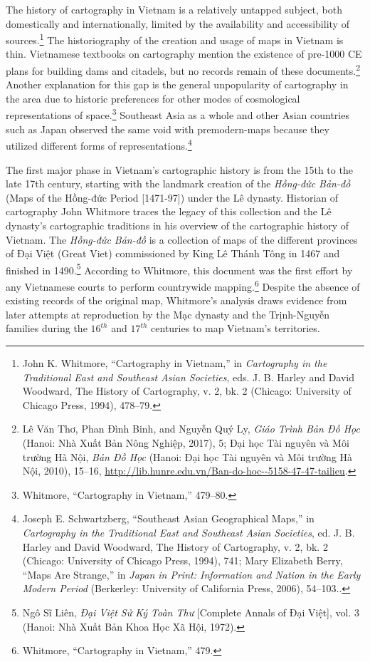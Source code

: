 The history of cartography in Vietnam is a relatively untapped subject, both domestically and internationally, limited by the availability and accessibility of sources.\footnote{John K. Whitmore, “Cartography in Vietnam,” in \textit{Cartography in the Traditional East and Southeast Asian Societies}, eds. J. B. Harley and David Woodward, The History of Cartography, v. 2, bk. 2 (Chicago: University of Chicago Press, 1994), 478–79.} The historiography of the creation and usage of maps in Vietnam is thin. Vietnamese textbooks on cartography mention the existence of pre-1000 CE plans for building dams and citadels, but no records remain of these documents.\footnote{\vi Lê Văn Thơ, Phan Đình Binh, and Nguyễn Quý Ly, \textit{Giáo Trình Bản Đồ Học} (Hanoi: Nhà Xuất Bản Nông Nghiệp, 2017), 5; Đại học Tài nguyên và Môi trường Hà Nội, \textit{Bản Đồ Học} (Hanoi: Đại học Tài nguyên và Môi trường Hà Nội, 2010), 15–16, \url{http://lib.hunre.edu.vn/Ban-do-hoc--5158-47-47-tailieu}.}  Another explanation for this gap is the general unpopularity of cartography in the area due to historic preferences for other modes of cosmological representations of space.\footnote{Whitmore, “Cartography in Vietnam,” 479–80.} Southeast Asia as a whole and other Asian countries such as Japan observed the same void with premodern-maps because they utilized different forms of representations.\footnote{Joseph E. Schwartzberg, “Southeast Asian Geographical Maps,” in \textit{Cartography in the Traditional East and Southeast Asian Societies}, ed. J. B. Harley and David Woodward, The History of Cartography, v. 2, bk. 2 (Chicago: University of Chicago Press, 1994), 741; Mary Elizabeth Berry, “Maps Are Strange,” in \textit{Japan in Print: Information and Nation in the Early Modern Period} (Berkerley: University of California Press, 2006), 54–103..}

The first major phase in Vietnam’s cartographic history is from the 15th to the late 17th century, starting with the landmark creation of the \vi \textit{Hồng-đức Bản-đồ} (Maps of the Hồng-đức Period [1471-97]) under the Lê dynasty. Historian of cartography John Whitmore traces the legacy of this collection and the Lê dynasty’s cartographic traditions in his overview of the cartographic history of Vietnam. The \textit{Hồng-đức Bản-đồ} is a collection of maps of the different provinces of Đại Việt (Great Viet) commissioned by King Lê Thánh Tông in 1467 and finished in 1490.\footnote{Ngô Sĩ Liên, \textit{Đại Việt Sử Ký Toàn Thư} [Complete Annals of Đại Việt], vol. 3 (Hanoi: Nhà Xuất Bản Khoa Học Xã Hội, 1972).} According to Whitmore, this document was the first effort by any Vietnamese courts to perform countrywide mapping.\footnote{Whitmore, “Cartography in Vietnam,” 479.} Despite the absence of existing records of the original map, Whitmore’s analysis draws evidence from later attempts at reproduction by the Mạc dynasty and the Trịnh-Nguyễn families during the $16^{th}$ and $17^{th}$ centuries to map Vietnam’s territories.

